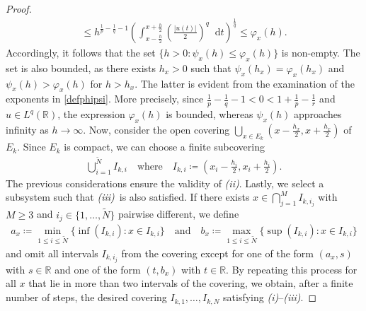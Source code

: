 \documentclass{article}
\newcommand{\dd}{\mathop{}\mathrm{d}} %
\renewcommand{\phi}{\varphi}
\newcommand{\eni}{\textit{(i)}}
\newcommand{\enii}{\textit{(ii)}}
\newcommand{\eniii}{\textit{(iii)}}
\numberwithin{figure}{section}
\newcommand{\R}{\mathbb{R}}
\numberwithin{equation}{section}
\begin{document}
\begin{proof}
\begin{align}
    \! \leq h^{\frac 1p - \frac 1q -1} \left( \int_{x-\frac h2}^{x+ \frac h2} \left(\frac{|u(t)|}{2}\right)^q\dd t\right)^{\frac 1q} 
    \! \leq \phi_x(h).
\end{align}
Accordingly, it follows that the set ${\{h>0: \psi_x(h) \leq \phi_x(h)\}}$ is non-empty. The set is also bounded, as there exists $h_x > 0$ such that $\psi_x(h_x)=\phi_x(h_x)$ and $\psi_x(h) > \phi_x(h)$ for $h>h_x$. The latter is evident from the examination of the exponents in \eqref{defphipsi}. More precisely, since $\frac 1p - \frac 1q -1< 0 < 1 + \frac 1p - \frac 1r$ and $u \in L^q(\R)$, the expression $\phi_x(h)$ is bounded, whereas $\psi_x(h)$ approaches infinity as $h \to \infty$. Now, consider the open covering $\bigcup_{x \in E_k} \left(x-\frac {h_x}2, x+\frac {h_x}2\right)$ of $E_k$. Since $E_k$ is compact, we can choose a finite subcovering 
\begin{align}
    \bigcup_{i=1}^{\tilde{N}} I_{k,i} \quad \text{where} \quad I_{k,i} \coloneq \left(x_i-\frac {h_i}2,x_i + \frac{h_i}2\right).
\end{align} 
The previous considerations ensure the validity of \enii. Lastly, we select a subsystem such that \eniii\ is also satisfied. If there exists $x \in \bigcap_{j=1}^M I_{k,i_j}$ with $M \geq 3$ and $i_j \in \{1,\ldots,\tilde{N}\}$ pairwise different, we define
\begin{align}
    a_x \coloneq  \min_{1 \leq i \leq \tilde{N}} \{\inf(I_{k,i}): x \in I_{k,i}\} \quad \text{and} \quad b_x\coloneq  \max_{1 \leq i \leq \tilde{N}}\{\sup(I_{k,i}): x \in I_{k,i}\}
\end{align}
and omit all intervals $I_{k,i_j}$ from the covering except for one of the form $(a_x,s)$ with $s \in \R$ and one of the form $(t,b_x)$ with $t \in \R$. By repeating this process for all $x$ that lie in more than two intervals of the covering, we obtain, after a finite number of steps, the desired covering $I_{k,1},\ldots,I_{k,N}$ satisfying \eni--\eniii.


\end{proof}
\end{document}
